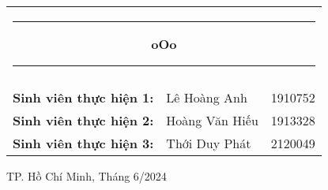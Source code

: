 \begin{titlepage}
\begin{center}
\begin{tabular}{rll}
                \multicolumn{3}{c}{\noindent\rule{4cm}{0.5pt} \textbf{oOo} \noindent\rule{4cm}{0.5pt}} \\ \\
                \color{black}\textbf{Sinh viên thực hiện 1:} & \color{black}Lê Hoàng Anh & \color{black}1910752 \\
                \color{black}\textbf{Sinh viên thực hiện 2:} & \color{black}Hoàng Văn Hiếu & \color{black}1913328 \\
                \color{black}\textbf{Sinh viên thực hiện 3:} & \color{black}Thới Duy Phát & \color{black}2120049 \\
            \end{tabular}
        \end{center}
    \endgroup
    
    \vspace{1.5cm}

    \begingroup
        \fontsize{12pt}{12pt}\selectfont
        \begin{center}
            {TP. Hồ Chí Minh, Tháng 6/2024}
        \end{center}
    \endgroup
    
\end{titlepage}